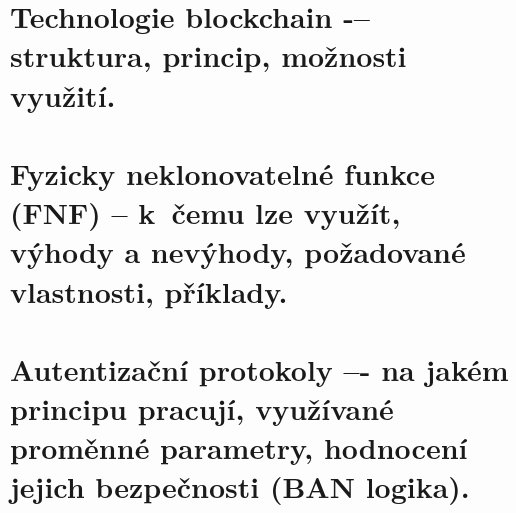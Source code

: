 \clearpage
\section{Technologie blockchain -– struktura, princip, možnosti využití.}

\clearpage
\section{Fyzicky neklonovatelné funkce (FNF) -- k~čemu lze využít, výhody a nevýhody, požadované vlastnosti, příklady.}

\clearpage
\section{Autentizační protokoly –- na jakém principu pracují, využívané proměnné parametry, hodnocení jejich bezpečnosti (BAN logika).}
